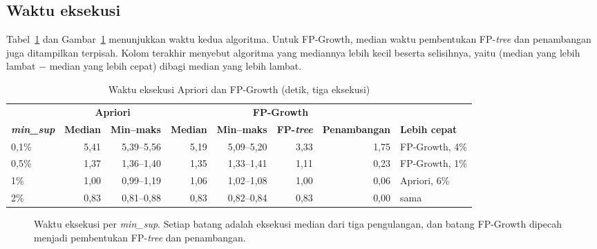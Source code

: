 \subsection{Waktu eksekusi}
\label{sec:hasil-t6-waktu}
Tabel~\ref{tab:t6-waktu} dan Gambar~\ref{fig:t6-waktu} menunjukkan waktu kedua algoritma. Untuk FP-Growth, median waktu pembentukan FP-\textit{tree} dan penambangan juga ditampilkan terpisah. Kolom terakhir menyebut algoritma yang mediannya lebih kecil beserta selisihnya, yaitu (median yang lebih lambat $-$ median yang lebih cepat) dibagi median yang lebih lambat.

\begin{table}[ht]
\caption{Waktu eksekusi Apriori dan FP-Growth (detik, tiga eksekusi)}
\label{tab:t6-waktu}
\footnotesize
\setlength{\tabcolsep}{4pt}
\begin{tabular}{@{}lrrrrrrl@{}}
\toprule
 & \multicolumn{2}{c}{\textbf{Apriori}} & \multicolumn{4}{c}{\textbf{FP-Growth}} & \\
\cmidrule(lr){2-3}\cmidrule(lr){4-7}
\textbf{\textit{min\_sup}} & \textbf{Median} & \textbf{Min--maks} & \textbf{Median} & \textbf{Min--maks} & \textbf{FP-\textit{tree}} & \textbf{Penambangan} & \textbf{Lebih cepat} \\
\midrule
0,1\% & 5,41 & 5,39--5,56 & 5,19 & 5,09--5,20 & 3,33 & 1,75 & FP-Growth, 4\% \\
0,5\% & 1,37 & 1,36--1,40 & 1,35 & 1,33--1,41 & 1,11 & 0,23 & FP-Growth, 1\% \\
1\% & 1,00 & 0,99--1,19 & 1,06 & 1,02--1,08 & 1,00 & 0,06 & Apriori, 6\% \\
2\% & 0,83 & 0,81--0,88 & 0,83 & 0,82--0,84 & 0,83 & 0,00 & sama \\
\bottomrule
\end{tabular}
\end{table}

\begin{figure}[ht]
\centering
{}
\caption{Waktu eksekusi per \textit{min\_sup}. Setiap batang adalah eksekusi median dari tiga pengulangan, dan batang FP-Growth dipecah menjadi pembentukan FP-\textit{tree} dan penambangan.}
\label{fig:t6-waktu}
\end{figure}

